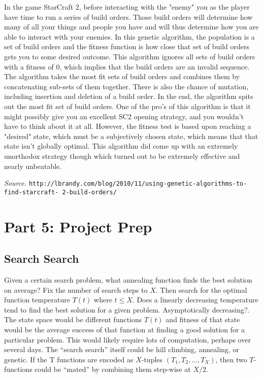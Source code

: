 \documentclass[11pt]{amsart}
\begin{document}
In the game StarCraft 2, before interacting with the "enemy" you as the player
have time to run a series of build orders.  Those build orders will determine
how many of all your things and people you have and will thus determine how you
are able to interact with your enemies.  In this genetic algorithm, the
population is a set of build orders and the fitness function is how close that
set of build orders gets you to some desired outcome.  This algorithm ignores
all sets of build orders with a fitness of 0, which implies that the build
orders are an invalid sequence.  The algorithm takes the most fit sets of build
orders and combines them by concatenating sub-sets of them together.  There is
also the chance of mutation, including insertion and deletion of a build order.
In the end, the algorithm spits out the most fit set of build orders.  One of
the pro's of this algorithm is that it might possibly give you an excellent
SC2 opening strategy, and you wouldn't have to think about it at all.
However, the fitness test is based upon reaching a "desired" state, which must
be a subjectively chosen state, which means that that state isn't globally
optimal.  This algorithm did come up with an extremely unorthodox strategy
though which turned out to be extremely effective and nearly unbeatable.

\emph{Source.} \texttt{http://lbrandy.com/blog/2010/11/using-genetic-algorithms-to-find-starcraft- 2-build-orders/}

\section*{Part 5: Project Prep}


\subsection*{Search Search}
Given a certain search problem, what annealing function finds the best solution
on average? Fix the number of search steps to $X$. Then search for the optimal
function temperature $T(t)$ where $t \leq X$. Does a linearly decreasing temperature
tend to find the best solution for a given problem.  Asymptotically
decreasing?. The state space would be different functions $T(t)$ and fitness of
that state would be the average success of that function at finding a good
solution for a particular problem. This would likely require lots of
computation, perhaps over several days. The “search search” itself could be
hill climbing, annealing, or genetic. If the T functions are encoded as
$X$-tuples $(T_1, T_2, \dots, T_X)$, then two $T$-functions could be “mated” by
combining them step-wise at $X/2$.
\end{document}
